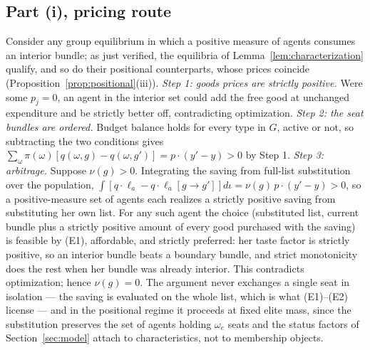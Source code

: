 \documentclass[12pt,letterpaper]{article}
\theoremstyle{definition}
\begin{document}
\subsection{Part (i), pricing route}
Consider any group equilibrium in which a positive measure of agents consumes an interior bundle; as just verified, the equilibria of Lemma~\ref{lem:characterization} qualify, and so do their positional counterparts, whose prices coincide (Proposition~\ref{prop:positional}(iii)).
\emph{Step 1: goods prices are strictly positive.}
Were some $p_j=0$, an agent in the interior set could add the free good at unchanged expenditure and be strictly better off, contradicting optimization.
\emph{Step 2: the seat bundles are ordered.}
Budget balance holds for every type in $G$, active or not, so subtracting the two conditions gives $\sum_{\omega}\pi(\omega)\left[q(\omega,g)-q(\omega,g')\right] = p\cdot(y'-y) > 0$ by Step 1.
\emph{Step 3: arbitrage.}
Suppose $\nu(g)>0$.
Integrating the saving from full-list substitution over the population, $\int \left[q\cdot\ell_a - q\cdot\ell_a[g\rightarrow g']\right]d\iota = \nu(g)\,p\cdot(y'-y)>0$, so a positive-measure set of agents each realizes a strictly positive saving from substituting her own list.
For any such agent the choice (substituted list, current bundle plus a strictly positive amount of every good purchased with the saving) is feasible by (E1), affordable, and strictly preferred: her taste factor is strictly positive, so an interior bundle beats a boundary bundle, and strict monotonicity does the rest when her bundle was already interior.
This contradicts optimization; hence $\nu(g)=0$.
The argument never exchanges a single seat in isolation --- the saving is evaluated on the whole list, which is what (E1)--(E2) license --- and in the positional regime it proceeds at fixed elite mass, since the substitution preserves the set of agents holding $\omega_e$ seats and the status factors of Section~\ref{sec:model} attach to characteristics, not to membership objects.
\end{document}
